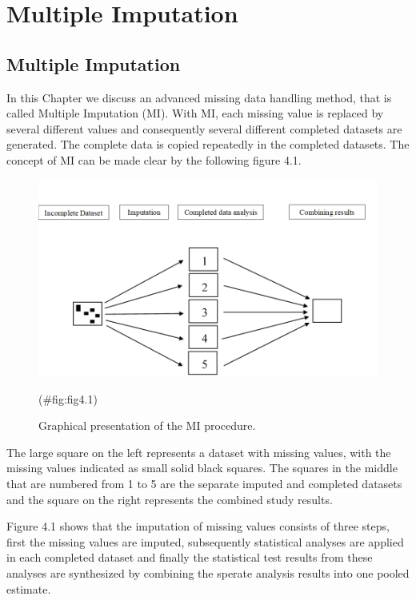 \documentclass[]{book}
\theoremstyle{definition}
\theoremstyle{definition}
\theoremstyle{definition}
\theoremstyle{remark}
\begin{document}
\chapter{Multiple Imputation}\label{multiple-imputation}

\section{Multiple Imputation}\label{multiple-imputation-1}

In this Chapter we discuss an advanced missing data handling method,
that is called Multiple Imputation (MI). With MI, each missing value is
replaced by several different values and consequently several different
completed datasets are generated. The complete data is copied repeatedly
in the completed datasets. The concept of MI can be made clear by the
following figure 4.1.

\begin{figure}

{\centering \includegraphics[width=0.9\linewidth]{images/fig4.1} 

}

\caption{Graphical presentation of the MI procedure. }(\#fig:fig4.1)
\end{figure}

The large square on the left represents a dataset with missing values,
with the missing values indicated as small solid black squares. The
squares in the middle that are numbered from 1 to 5 are the separate
imputed and completed datasets and the square on the right represents
the combined study results.

Figure 4.1 shows that the imputation of missing values consists of three
steps, first the missing values are imputed, subsequently statistical
analyses are applied in each completed dataset and finally the
statistical test results from these analyses are synthesized by
combining the sperate analysis results into one pooled estimate.
\end{document}

